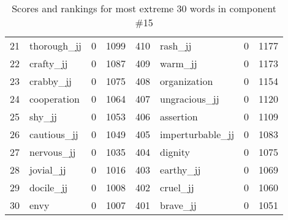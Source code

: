 \begin{table}[tbp]
\begin{tabular}{| rlr@{.}l | rlr@{.}l |}
    21 & thorough\_jj & 0 & 1099    &    410 & rash\_jj & 0 & 1177 \\
    22 & crafty\_jj & 0 & 1087    &    409 & warm\_jj & 0 & 1173 \\
    23 & crabby\_jj & 0 & 1075    &    408 & organization & 0 & 1154 \\
    24 & cooperation & 0 & 1064    &    407 & ungracious\_jj & 0 & 1120 \\
    25 & shy\_jj & 0 & 1053    &    406 & assertion & 0 & 1109 \\
    26 & cautious\_jj & 0 & 1049    &    405 & imperturbable\_jj & 0 & 1083 \\
    27 & nervous\_jj & 0 & 1035    &    404 & dignity & 0 & 1075 \\
    28 & jovial\_jj & 0 & 1016    &    403 & earthy\_jj & 0 & 1069 \\
    29 & docile\_jj & 0 & 1008    &    402 & cruel\_jj & 0 & 1060 \\
    30 & envy & 0 & 1007    &    401 & brave\_jj & 0 & 1051 \\
    \hline
    \end{tabular}
    \caption{Scores and rankings for most extreme 30 words in component \#15} 
\end{table}
\clearpage
